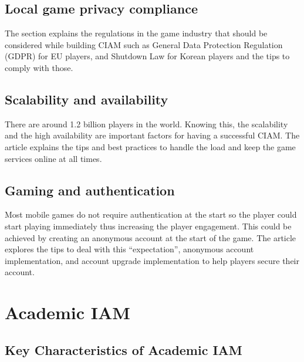 \hypertarget{local-game-privacy-compliance}{%
\section{Local game privacy
compliance}\label{local-game-privacy-compliance}}

The section explains the regulations in the game industry that should be
considered while building CIAM such as General Data Protection
Regulation (GDPR) for EU players, and Shutdown Law for Korean players
and the tips to comply with those.

\hypertarget{scalability-and-availability}{%
\section{Scalability and availability
}\label{scalability-and-availability}}

There are around 1.2 billion players in the world. Knowing this, the
scalability and the high availability are important factors for having a
successful CIAM. The article explains the tips and best practices to
handle the load and keep the game services online at all times.~

\hypertarget{gaming-and-authentication}{%
\section{Gaming and authentication}\label{gaming-and-authentication}}

Most mobile games do not require authentication at the start so the
player could start playing immediately thus increasing the player
engagement. This could be achieved by creating an anonymous account at
the start of the game. The article explores the tips to deal with this
``expectation'', anonymous account implementation, and account upgrade
implementation to help players secure their account.

\hypertarget{academic-iam}{%
\chapter{Academic IAM}\label{academic-iam}}

\hypertarget{key-characteristics-of-academic-iam}{%
\section{Key Characteristics of Academic
IAM}\label{key-characteristics-of-academic-iam}}

